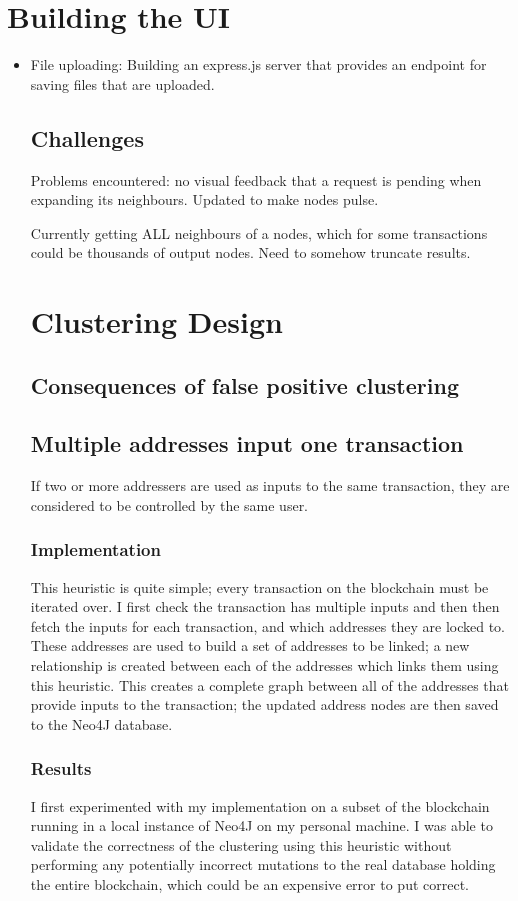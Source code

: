 \section{Building the UI} 
\begin{itemize}
    \item File uploading: Building an express.js server that provides an endpoint for saving files that are uploaded. 
    
\subsection{Challenges}
Problems encountered: no visual feedback that a request is pending when expanding its neighbours. Updated to make nodes pulse. 

Currently getting ALL neighbours of a nodes, which for some transactions could be thousands of output nodes. Need to somehow truncate results.

\section{Clustering Design}
\subsection{Consequences of false positive clustering} 

\subsection{Multiple addresses input one transaction}
If two or more addressers are used as inputs to the same transaction, they are considered to be controlled by the same user. 
\subsubsection{Implementation}
This heuristic is quite simple; every transaction on the blockchain must be iterated over. I first check the transaction has multiple inputs and then then fetch the inputs for each transaction, and which addresses they are locked to. These addresses are used to build a set of addresses to be linked; a new relationship is created between each of the addresses which links them using this heuristic. This creates a complete graph between all of the addresses that provide inputs to the transaction; the updated address nodes are then saved to the Neo4J database. 

\subsubsection{Results}
I first experimented with my implementation on a subset of the blockchain running in a local instance of Neo4J on my personal machine. I was able to validate the correctness of the clustering using this heuristic without performing any potentially incorrect mutations to the real database holding the entire blockchain, which could be an expensive error to put correct. 






\end{itemize}
